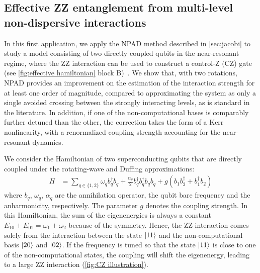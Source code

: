 \documentclass[%
 reprint,
 amsmath,amssymb,
 aps,
pra,
noeprint,
superscriptaddress,
]{revtex4-2}
\begin{document}
\subsection{Effective ZZ entanglement from multi-level non-dispersive interactions}
\label{sec:application1}
In this first application, we apply the NPAD method described in \cref{sec:jacobi} to study a model consisting of two directly coupled qubits in the near-resonant regime, where the ZZ interaction can be used to construct a control-Z (CZ) gate (see \cref{fig:effective hamiltonian} block B)~\cite{Dicarlo2009,Chen2014,Barends2014,Rol2019}.
We show that, with two rotations, NPAD provides an improvement on the estimation of the interaction strength for at least one order of magnitude, compared to approximating the system as only a single avoided crossing between the strongly interacting levels, as is standard in the literature.
In addition, if one of the non-computational bases is comparably further detuned than the other, the correction takes the form of a Kerr nonlinearity, with a renormalized coupling strength accounting for the near-resonant dynamics.


We consider the Hamiltonian of two superconducting qubits that are directly coupled under the rotating-wave \cite{Motzoi2013, zeuch2020exact} and Duffing \cite{khani2009optimal} approximations:
\begin{align}
    H &= \sum_{q \in \{1,2\}}\omega_q b_q^{\dagger} b_q + \frac{\alpha_q}{2} b_q^{\dagger} b_q^{\dagger} b_qb_q + g (b_1 b_2^{\dagger} + b_1^{\dagger} b_2)
\label{eq:sc duffing model}
\end{align}
where $b_q$, $\omega_q$, $\alpha_q$ are the annihilation operator, the qubit bare frequency and the anharmonicity, respectively. The parameter $g$ denotes the coupling strength.
In this Hamiltonian, the sum of the eigenenergies is always a constant $E_{10} + E_{01} = \omega_1 + \omega_2$ because of the symmetry.
Hence, the ZZ interaction comes solely from the interaction between the state $\ket{11}$ and the non-computational basis $\ket{20}$ and $\ket{02}$.
If the frequency is tuned so that the state $\ket{11}$ is close to one of the non-computational states, the coupling will shift the eigenenergy, leading to a large ZZ interaction (\cref{fig:CZ illustration}).
\end{document}

